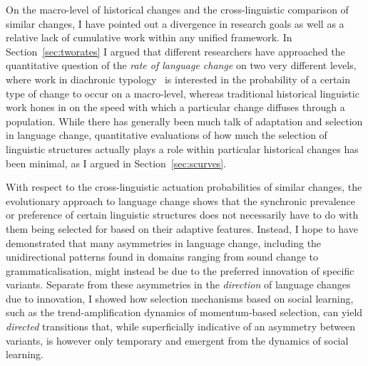 On the macro-level of historical changes and the cross-linguistic comparison of similar changes, I have pointed out a divergence in research goals as well as a relative lack of cumulative work within any unified framework. In Section~\ref{sec:tworates} I argued that different researchers have approached the quantitative question of the \emph{rate of language change} on two very different levels, where work in diachronic typology~\citep[such as][]{Bickel2015} is interested in the probability of a certain type of change to occur on a macro-level, whereas traditional historical linguistic work hones in on the speed with which a particular change diffuses through a population.
While there has generally been much talk of adaptation and selection in language change, quantitative evaluations of how much the selection of linguistic structures actually plays a role within particular historical changes has been minimal, as I argued in Section~\ref{sec:scurves}.

With respect to the cross-linguistic actuation probabilities of similar changes, the evolutionary approach to language change shows that the synchronic prevalence or preference of certain linguistic structures does not necessarily have to do with them being selected for based on their adaptive features. Instead, I hope to have demonstrated that many asymmetries in language change, including the unidirectional patterns found in domains ranging from sound change to grammaticalisation, might instead be due to the preferred innovation of specific variants. Separate from these asymmetries in the \emph{direction} of language changes due to innovation, I showed how selection mechanisms based on social learning, such as the trend-amplification dynamics of momentum-based selection, can yield \emph{directed} transitions that, while superficially indicative of an asymmetry between variants, is however only temporary and emergent from the dynamics of social learning.



